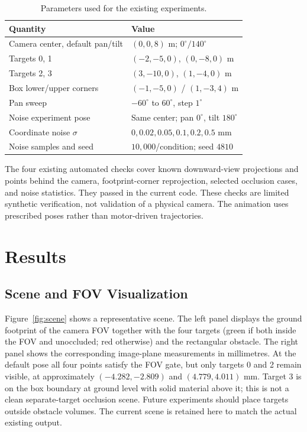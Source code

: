 \documentclass[11pt,letterpaper]{article}
\begin{document}
\begin{table}[htbp]
\centering\small
\caption{Parameters used for the existing experiments.}
\begin{tabular}{ll}\toprule
Quantity & Value\\\midrule
Camera center, default pan/tilt & $(0,0,8)$ m; $0^\circ/140^\circ$\\
Targets 0, 1 & $(-2,-5,0)$, $(0,-8,0)$ m\\
Targets 2, 3 & $(3,-10,0)$, $(1,-4,0)$ m\\
Box lower/upper corners & $(-1,-5,0)$ / $(1,-3,4)$ m\\
Pan sweep & $-60^\circ$ to $60^\circ$, step $1^\circ$\\
Noise experiment pose & Same center; pan $0^\circ$, tilt $180^\circ$\\
Coordinate noise $\sigma$ & $0,0.02,0.05,0.1,0.2,0.5$ mm\\
Noise samples and seed & $10{,}000$/condition; seed $4810$\\\bottomrule
\end{tabular}
\end{table}
The four existing automated checks cover known downward-view projections and points behind the camera, footprint-corner reprojection, selected occlusion cases, and noise statistics. They passed in the current code. These checks are limited synthetic verification, not validation of a physical camera. The animation uses prescribed poses rather than motor-driven trajectories.

\section{Results}
\label{sec:results}

\subsection{Scene and FOV Visualization}
Figure~\ref{fig:scene} shows a representative scene. The left panel displays the ground footprint of the camera FOV together with the four targets (green if both inside the FOV and unoccluded; red otherwise) and the rectangular obstacle. The right panel shows the corresponding image-plane measurements in millimetres. At the default pose all four points satisfy the FOV gate, but only targets 0 and 2 remain visible, at approximately $(-4.282,-2.809)$ and $(4.779,4.011)$ mm. Target 3 is on the box boundary at ground level with solid material above it; this is not a clean separate-target occlusion scene. Future experiments should place targets outside obstacle volumes. The current scene is retained here to match the actual existing output.
\end{document}
